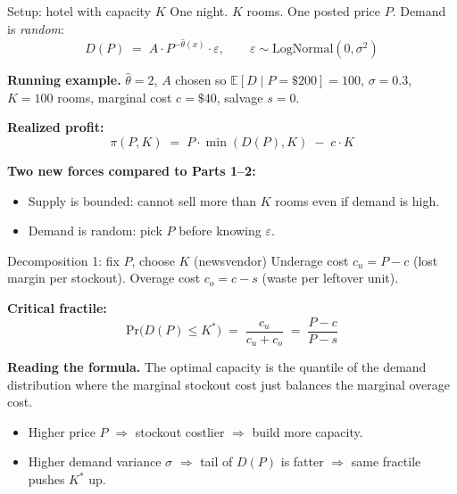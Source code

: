 \documentclass[aspectratio=169, 11pt, handout]{beamer}
\newcommand{\E}{\mathbb{E}}
\newcommand{\Prob}{\mathrm{Pr}}
\begin{document}
\begin{frame}{Setup: hotel with capacity $K$}
One night. $K$ rooms. One posted price $P$. Demand is \emph{random}:
\[
D(P) \;=\; A \cdot P^{-\hat\theta(x)} \cdot \varepsilon, \qquad \varepsilon \sim \mathrm{LogNormal}(0, \sigma^2)
\]
\vspace{0.2em}

\textbf{Running example.} $\hat\theta = 2$, $A$ chosen so $\E[D \mid P = \$200] = 100$, $\sigma = 0.3$, $K = 100$ rooms, marginal cost $c = \$40$, salvage $s = 0$.
\vspace{0.6em}

\textbf{Realized profit:}
\[
\pi(P, K) \;=\; P \cdot \min(D(P), K) \;-\; c \cdot K
\]
\vspace{0.2em}

\textbf{Two new forces compared to Parts 1--2:}
\begin{itemize}
    \item Supply is bounded: cannot sell more than $K$ rooms even if demand is high.
    \item Demand is random: pick $P$ before knowing $\varepsilon$.
\end{itemize}
\end{frame}

\begin{frame}{Decomposition 1: fix $P$, choose $K$ (newsvendor)}
Underage cost $c_u = P - c$ (lost margin per stockout). Overage cost $c_o = c - s$ (waste per leftover unit).
\vspace{0.4em}

\textbf{Critical fractile:}
\[
\Prob\big(D(P) \leq K^*\big) \;=\; \frac{c_u}{c_u + c_o} \;=\; \frac{P - c}{P - s}
\]
\vspace{0.2em}

\textbf{Reading the formula.} The optimal capacity is the quantile of the demand distribution where the marginal stockout cost just balances the marginal overage cost.
\vspace{0.4em}

\begin{itemize}
    \item Higher price $P$ $\Rightarrow$ stockout costlier $\Rightarrow$ build more capacity.
    \item Higher demand variance $\sigma$ $\Rightarrow$ tail of $D(P)$ is fatter $\Rightarrow$ same fractile pushes $K^*$ up.
\end{itemize}

\end{frame}
\end{document}
